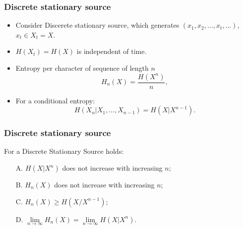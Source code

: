 \documentclass[14pt]{beamer}
\begin{document}

\begin{frame}
\frametitle{Discrete stationary source}
\begin{itemize}
    
    \item Consider Discerete stationary source, which generates $(x_1 ,x_2 ,\dots,x_t ,\dots)$,$x_t \in X_t = X$.
    
    \item $H(X_t ) = H(X)$ is independent of time.
    
    \item Entropy per character of sequence of length $n$
    \[
    H_n (X) = \frac{H(X^n)}{n},
    \]
    
    \item For a conditional entropy:
    \[
    H(X_n \vert X_1,\dots,X_{n - 1} ) = H(X\vert X^{n - 1}).
    \]
    
\end{itemize}
\end{frame}


\begin{frame}
\frametitle{Discrete stationary source}

\begin{theorem}\label{THN} For a Discrete Stationary Source holds:
\begin{itemize}

\item[A.] $H(X\vert X^n)$ does not increase with increasing $n$;

\item[B.] $H_n (X)$ does not increase with increasing $n$;

\item[C.] $H_n (X) \ge H(X / X^{n - 1})$;

\item[D.] $\mathop {\lim }\limits_{n \to \infty } H_n (X) = \mathop {\lim }\limits_{n \to \infty } H(X\vert X^n)$.
\end{itemize}

\end{theorem}
\end{frame}
\end{document}
